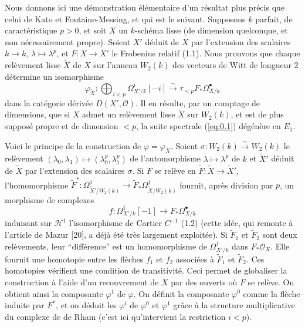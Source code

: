 \documentclass[12pt,a4paper]{article}
\theoremstyle{plain}
\theoremstyle{definition}
\theoremstyle{remark}
\newcommand{\cO}{\mathcal{O}}
\begin{document}
Nous donnons ici une d\'emonstration \'el\'ementaire d'un r\'esultat plus pr\'ecis que
celui de Kato et Fontaine-Messing, et qui est le suivant. Supposons $k$ parfait, de
caract\'eristique $p > 0$, et soit $X$ un $k$-sch\'ema lisse (de dimension quelconque, et non
n\'ecessairement propre). Soient $X'$ d\'eduit de $X$ par l'extension des scalaires $k \to k$,
$\lambda \mapsto \lambda^p$, et $F: X \to X'$ le Frobenius relatif (1.1). Nous prouvons que chaque
rel\`evement lisse $\tilde{X}$ de $X$ sur l'anneau $W_2(k)$ des vecteurs de Witt de longueur 2
d\'etermine un isomorphisme
\begin{equation}\label{eq:0.2}
\varphi_{\tilde{X}}: \bigoplus_{i < p} \Omega^i_{X'/k}[-i] \xrightarrow{\sim} \tau_{<p} F_* \Omega^{\bullet}_{X/k}
\end{equation}
dans la cat\'egorie d\'eriv\'ee $D(X', \cO)$. Il en r\'esulte, par un comptage de dimensions,
que si $X$ admet un rel\`evement lisse $\tilde{X}$ sur $W_2(k)$, et est de plus suppos\'e propre et de
dimension $<p$, la suite spectrale (\ref{eq:0.1}) d\'eg\'en\`ere en $E_1$.

Voici le principe de la construction de $\varphi = \varphi_{\tilde{X}}$. Soient $\sigma: W_2(k) \xrightarrow{\sim} W_2(k)$ le
rel\`evement $(\lambda_0, \lambda_1) \mapsto (\lambda_0^p, \lambda_1^p)$ de l'automorphisme $\lambda \mapsto \lambda^p$ de $k$ et $\tilde{X}'$ d\'eduit de $\tilde{X}$ par
l'extension des scalaires $\sigma$. Si $F$ se rel\`eve en $\tilde{F}: \tilde{X} \to \tilde{X}'$, l'homomorphisme
$\tilde{F}^*: \Omega^1_{\tilde{X}'/W_2(k)} \to \tilde{F}_* \Omega^1_{\tilde{X}/W_2(k)}$ fournit, apr\`es division par $p$, un morphisme de complexes
\[
f: \Omega^1_{X'/k}[-1] \to F_* \Omega^{\bullet}_{X/k}
\]
induisant sur $\mathscr{H}^1$ l'isomorphisme de Cartier $C^{-1}$ (1.2) (cette id\'ee, qui remonte \`a
l'article de Mazur [20], a d\'ej\`a \'et\'e tr\`es largement exploit\'ee). Si $\tilde{F}_1$ et $\tilde{F}_2$ sont deux
rel\`evements, leur ``diff\'erence'' est un homomorphisme de $\Omega^1_{X'/k}$ dans $F_* \cO_X$. Elle
fournit une homotopie entre les fl\`eches $f_1$ et $f_2$ associ\'ees \`a $\tilde{F}_1$ et $\tilde{F}_2$. Ces
homotopies v\'erifient une condition de transitivit\'e. Ceci permet de globaliser la
construction \`a l'aide d'un recouvrement de $X$ par des ouverts o\`u $F$ se rel\`eve. On
obtient ainsi la composante $\varphi^1$ de $\varphi$. On d\'efinit la composante $\varphi^0$ comme la fl\`eche
induite par $F^*$, et on d\'eduit les $\varphi^i$ de $\varphi^0$ et $\varphi^1$ gr\^ace \`a la structure multiplicative du
complexe de de Rham (c'est ici qu'intervient la restriction $i < p$).
\end{document}
